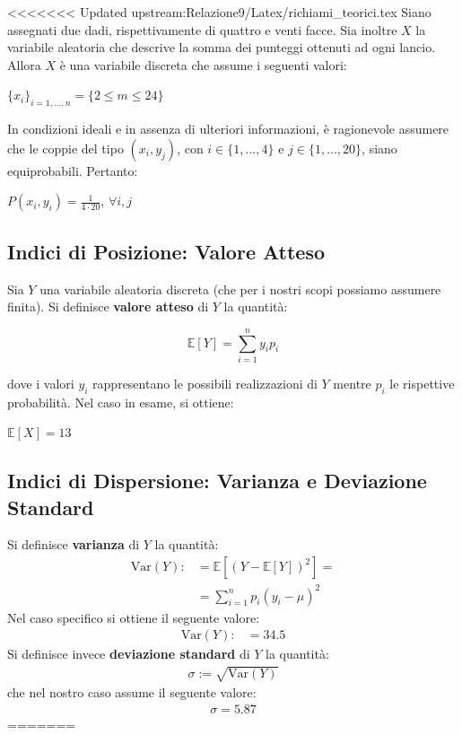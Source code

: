 <<<<<<< Updated upstream:Relazione9/Latex/richiami_teorici.tex
Siano assegnati due dadi, rispettivamente di quattro e venti facce. Sia inoltre $X$ la variabile aleatoria che descrive la somma dei punteggi ottenuti ad ogni lancio. Allora $X$ è una variabile discreta che assume i seguenti valori:
\begin{center}
    $\{x_i\}_{i=1,...,n} = \{2 \leq m \leq 24\}$
\end{center}
In condizioni ideali e in assenza di ulteriori informazioni, è ragionevole assumere che le coppie del tipo $(x_i, y_j)$, con $i \in \{1,...,4\}$ e $j \in \{1,...,20\}$, siano equiprobabili. Pertanto:
\begin{center}
    $P(x_i, y_i) = \frac{1}{4 \cdot 20}$, $\forall i, j$
\end{center}




\subsection{Indici di Posizione: Valore Atteso}
Sia $Y$ una variabile aleatoria discreta (che per i nostri scopi possiamo assumere finita). Si definisce \textbf{valore atteso} di $Y$ la quantità:
\begin{center}
    \[\mathbb{E}[Y] = \sum_{i=1}^{n} y_i p_i\]
\end{center}
dove i valori $y_i$ rappresentano le possibili realizzazioni di $Y$ mentre $p_i$ le rispettive probabilità. Nel caso in esame, si ottiene:
\begin{center}
    $\mathbb{E}[X] = 13$
\end{center}
\subsection{Indici di Dispersione: Varianza e Deviazione Standard}
Si definisce \textbf{varianza} di $Y$ la quantità:
\begin{align*}
    \mathrm{Var}(Y) :&= \mathbb{E}[(Y-\mathbb{E}[Y])^2]= \\
    &= \sum_{i=1}^{n}p_i(y_i - \mu)^2
\end{align*}
Nel caso specifico si ottiene il seguente valore:
\begin{align*}
    \mathrm{Var}(Y) :&= 34.5
\end{align*}
Si definisce invece \textbf{deviazione standard} di $Y$ la quantità:
\begin{align*}
    \sigma := \sqrt{\text{Var}(Y)}
\end{align*}
che nel nostro caso assume il seguente valore:
\begin{align*}
    \sigma = 5.87
\end{align*}
=======
